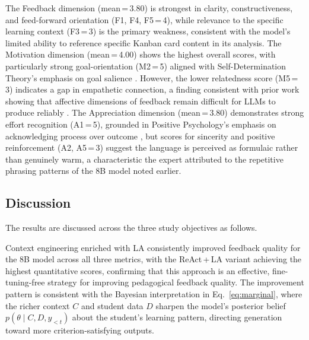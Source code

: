 \documentclass[conference,a4paper]{IEEEtran}
\begin{document}
The Feedback dimension (mean\,=\,3.80) is 
strongest in clarity, constructiveness, and 
feed-forward orientation (F1, F4, F5\,=\,4), 
while relevance to the specific learning context 
(F3\,=\,3) is the primary weakness, consistent 
with the model's limited ability to reference 
specific Kanban card content in its analysis. 
The Motivation dimension (mean\,=\,4.00) shows 
the highest overall scores, with particularly 
strong goal-orientation (M2\,=\,5) aligned with 
Self-Determination Theory's emphasis on goal 
salience \cite{DeciRyan1985IntrinsicMotivation}. 
However, the lower relatedness score (M5\,=\,3) 
indicates a gap in empathetic connection, a 
finding consistent with prior work showing 
that affective dimensions of feedback remain 
difficult for LLMs to produce reliably 
\cite{jacobsen2025promises}. The Appreciation 
dimension (mean\,=\,3.80) demonstrates strong 
effort recognition (A1\,=\,5), grounded in 
Positive Psychology's emphasis on acknowledging 
process over outcome 
\cite{Fredrickson2001BroadenBuild}, but scores 
for sincerity and positive reinforcement (A2, 
A5\,=\,3) suggest the language is perceived as 
formulaic rather than genuinely warm, a
characteristic the expert attributed to the 
repetitive phrasing patterns of the 8B model 
noted earlier.

\subsection{Discussion}

The results are discussed across the three
study objectives as follows.

Context engineering enriched with LA
consistently improved feedback quality for the
8B model across all three metrics, with the
ReAct\,+\,LA variant achieving the highest
quantitative scores, confirming that this
approach is an effective, fine-tuning-free
strategy for improving pedagogical feedback quality. The improvement 
pattern is consistent with the Bayesian 
interpretation in Eq.~\eqref{eq:marginal}, where the 
richer context $C$ and student data $D$ sharpen 
the model's posterior belief $p(\theta \mid C, 
D, y_{<t})$ about the student's learning 
pattern, directing generation toward more 
criterion-satisfying outputs.
\end{document}
